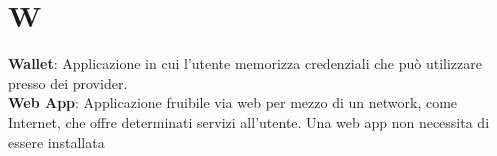 \section{W}
\textbf{Wallet}: Applicazione in cui l'utente memorizza credenziali che può utilizzare presso dei provider.\\ %
\textbf{Web App}: Applicazione fruibile via web per mezzo di un network, come Internet, che offre determinati servizi all'utente. Una web app non necessita di essere installata
